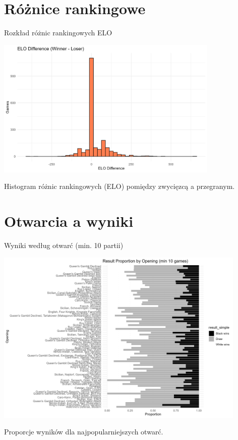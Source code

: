 \documentclass{beamer}
\begin{document}
\section{Różnice rankingowe}
\begin{frame}{Rozkład różnic rankingowych ELO}
  \begin{center}
    \includegraphics[width=0.8\textwidth]{../../ChessPlots/elo_diff_hist.png}
  \end{center}
  \small
  Histogram różnic rankingowych (ELO) pomiędzy zwycięzcą a przegranym.
\end{frame}

\section{Otwarcia a wyniki}
\begin{frame}{Wyniki według otwarć (min. 10 partii)}
  \begin{center}
    \includegraphics[width=0.9\textwidth]{../../ChessPlots/openings_by_result.png}
  \end{center}
  \small
  Proporcje wyników dla najpopularniejszych otwarć.
\end{frame}
\end{document}
